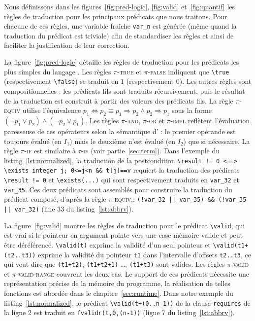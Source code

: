 Nous définissons dans les figures~\ref{fig:pred-logic}, \ref{fig:valid}
et~\ref{fig:quantif} les règles de traduction pour les principaux
prédicats \eacsl que nous traitons.
Pour chacune de ces règles, une variable fraîche \lstinline'var_n' est générée
(même quand la traduction du prédicat est triviale) afin de standardiser les
règles et ainsi de faciliter la justification de leur correction.



La figure~\ref{fig:pred-logic} détaille les règles de traduction pour les
prédicats les plus simples du langage \eacsl.
Les règles \textsc{$\pi$-true} et \textsc{$\pi$-false} indiquent que
\lstinline'\true' (respectivement \lstinline'\false') se traduit en $1$
(respectivement $0$).
Les autres règles sont compositionnelles :
les prédicats fils sont traduits récursivement, puis le résultat de la
traduction est construit à partir des valeurs des prédicats fils.
La règle \textsc{$\pi$-equiv} utilise l'équivalence
$p_1 \Leftrightarrow p_2 \equiv p_1 \Rightarrow p_2 \land p_2 \Rightarrow p_1$
sous la forme $(\lnot p_1 \lor p_2) \land (\lnot p_2 \lor p_1)$.
Les règles \textsc{$\pi$-and}, \textsc{$\pi$-or} et \textsc{$\pi$-impl}
reflètent l'évaluation paresseuse de ces opérateurs selon la sémantique d'\eacsl
: le premier opérande est toujours évalué (en $I_1$) mais le deuxième n'est
évalué (en $I_2$) que si nécessaire.
La règle \textsc{$\pi$-if} est similaire à \textsc{$\tau$-if} (voir
partie~\ref{sec:term}).
Dans l'exemple du listing~\ref{lst:normalized}, la traduction de la
postcondition
\lstinline{\result != 0 <==> \exists integer j; 0<=j<n && t[j]==v} requiert
la traduction des prédicats \lstinline'\result != 0' et
\lstinline{\exists(...)} qui sont respectivement traduits en \lstinline'var_32'
et \lstinline'var_35'.
Ces deux prédicats sont assemblés pour construire la traduction du prédicat
composé, d'après la règle \textsc{$\pi$-equiv},:
\lstinline'(!var_32 || var_35) && (!var_35 || var_32)' (line 33 du
listing~\ref{lst:abbrv}).



La figure~\ref{fig:valid} montre les règles de traduction pour le prédicat
\lstinline'\valid', qui est vrai si le pointeur en argument pointe vers une
case mémoire valide et peut être déréférencé.
\lstinline'\valid(t)' exprime la validité d'un seul pointeur et
\lstinline'\valid(t1+(t2..t3))' exprime la validité du pointeur \lstinline't1'
dans l'intervalle d'offsets \lstinline't2..t3', ce qui veut dire que
\lstinline'(t1+t2)', \lstinline'(t1+t2+1)' \dots, \lstinline'(t1+t3)' sont
valides.
Les règles \textsc{$\pi$-valid} et \textsc{$\pi$-valid-range} couvrent les deux
cas.
Le support de ces prédicats nécessite une représentation précise de la mémoire
du programme, la réalisation de telles fonctions est abordée dans le
chapitre~\ref{sec:runtime}.
Dans notre exemple du listing~\ref{lst:normalized}, le prédicat
\lstinline'\valid(t+(0..n-1))' de la clause \lstinline'requires' de la ligne 2
est traduit en \lstinline[style=c]'fvalidr(t,0,(n-1))' (ligne 7 du
listing~\ref{lst:abbrv}).

